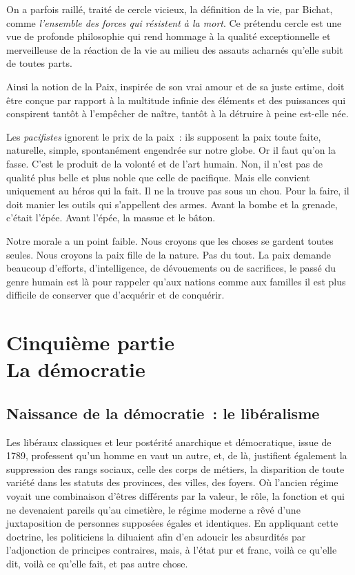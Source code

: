 \documentclass[french,twoside]{book} %
\newcommand{\astermono}{\medskip\centerline{\color{rubric}\large\selectfont{\syms ✻}}\medskip\par}%
\newcommand\chapteropen{} %
\newcommand\chaptercont{} %
\newcommand\chapterclose{} %
\begin{document}
\astermono

\noindent On a parfois raillé, traité de cercle vicieux, la définition de la vie, par Bichat, comme \emph{l’ensemble des forces qui résistent à la mort}. Ce prétendu cercle est une vue de profonde philosophie qui rend hommage à la qualité exceptionnelle et merveilleuse de la réaction de la vie au milieu des assauts acharnés qu’elle subit de toutes parts.\par
Ainsi la notion de la Paix, inspirée de son vrai amour et de sa juste estime, doit être conçue par rapport à la multitude infinie des éléments et des puissances qui conspirent tantôt à l’empêcher de naître, tantôt à la détruire à peine est-elle née.\par
Les \emph{pacifistes} ignorent le prix de la paix : ils supposent la paix toute faite, naturelle, simple, spontanément engendrée sur notre globe. Or il faut qu’on la fasse. C’est le produit de la volonté et de l’art humain. Non, il n’est pas de qualité plus belle et plus noble que celle de pacifique. Mais elle convient uniquement au héros qui la fait. Il ne la trouve pas sous un chou. Pour la faire, il doit manier les outils qui s’appellent des armes. Avant la bombe et la grenade, c’était l’épée. Avant l’épée, la massue et le bâton.\par
Notre morale a un point faible. Nous croyons que les choses se gardent toutes seules. Nous croyons la paix fille de la nature. Pas du tout. La paix demande beaucoup d’efforts, d’intelligence, de dévouements ou de sacrifices, le passé du genre humain est là pour rappeler qu’aux nations comme aux familles il est plus difficile de conserver que d’acquérir et de conquérir.
\chapterclose


\chapteropen
\chapter[{Cinquième partie. La démocratie}]{Cinquième partie \\
La démocratie}\renewcommand{\leftmark}{Cinquième partie \\
La démocratie}


\chaptercont
\section[{Naissance de la démocratie : le libéralisme}]{Naissance de la démocratie : le libéralisme}
\noindent Les libéraux classiques et leur postérité anarchique et démocratique, issue de 1789, professent qu’un homme en vaut un autre, et, de là, justifient également la suppression des rangs sociaux, celle des corps de métiers, la disparition de toute variété dans les statuts des provinces, des villes, des foyers. Où l’ancien régime voyait une combinaison d’êtres différents par la valeur, le rôle, la fonction et qui ne devenaient pareils qu’au cimetière, le régime moderne a rêvé d’une juxtaposition de personnes supposées égales et identiques. En appliquant cette doctrine, les politiciens la diluaient afin d’en adoucir les absurdités par l’adjonction de principes contraires, mais, à l’état pur et franc, voilà ce qu’elle dit, voilà ce qu’elle fait, et pas autre chose.
\end{document}
